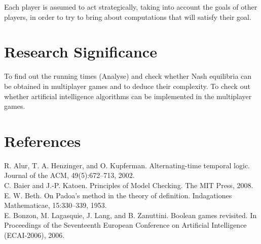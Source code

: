 \documentclass[14pt, a4paper]{article}
\begin{document}
	Each player is assumed to act strategically, taking into account the goals of other players,
in order to try to bring about computations that will satisfy their goal.\\

			
			\section{Research Significance}
			
				To find out the running times (Analyse) and check whether Nash equilibria can be obtained in multiplayer games and to deduce their complexity.
				To check out whether artificial intelligence algorithms can be implemented in the multiplayer 
games.

			
			\section{References}
R. Alur, T. A. Henzinger, and O. Kupferman. Alternating-time
temporal logic. Journal of the ACM, 49(5):672–713, 2002.\\
C. Baier and J.-P. Katoen. Principles of Model Checking. The
MIT Press, 2008.\\
E. W. Beth. On Padoa’s method in the theory of definition.
Indagationes Mathematicae, 15:330–339, 1953.\\
E. Bonzon, M. Lagasquie, J. Lang, and B. Zanuttini. Boolean
games revisited. In Proceedings of the Seventeenth European
Conference on Artificial Intelligence (ECAI-2006), 2006.\\
				
	

	
\end{document}
